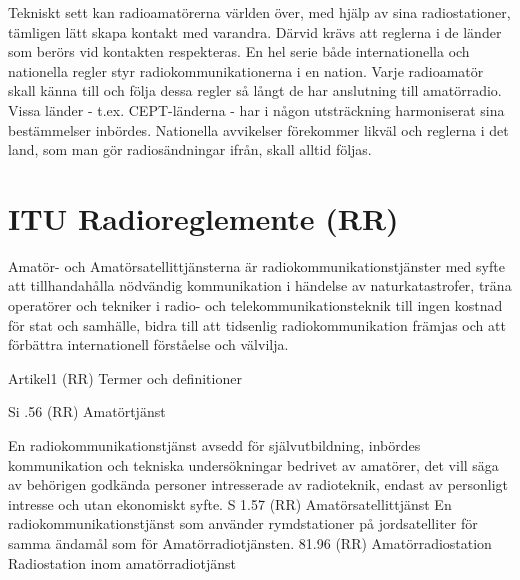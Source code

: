 %
%
%
%
%
%

Tekniskt sett kan radioamatörerna världen
över, med hjälp av sina radiostationer, tämligen lätt skapa kontakt med varandra. Därvid krävs att reglerna i de länder som berörs
vid kontakten respekteras.
En hel serie både internationella och nationella regler styr radiokommunikationerna
i en nation. Varje radioamatör skall känna till
och följa dessa regler så långt de har anslutning till amatörradio. Vissa länder - t.ex.
CEPT-länderna - har i någon utsträckning
harmoniserat sina bestämmelser inbördes.
Nationella avvikelser förekommer likväl och
reglerna i det land, som man gör radiosändningar ifrån, skall alltid följas.

\section{ITU Radioreglemente (RR)}

Amatör- och Amatörsatellittjänsterna är radiokommunikationstjänster med syfte att tillhandahålla nödvändig kommunikation i händelse av naturkatastrofer, träna operatörer
och tekniker i radio- och telekommunikationsteknik till ingen kostnad för stat och
samhälle, bidra till att tidsenlig radiokommunikation främjas och att förbättra internationell förståelse och välvilja.

Artikel1 (RR) Termer och definitioner

Si .56 (RR) Amatörtjänst

En radiokommunikationstjänst avsedd för
självutbildning, inbördes kommunikation och
tekniska undersökningar bedrivet av amatörer, det vill säga av behörigen godkända
personer intresserade av radioteknik, endast av personligt intresse och utan ekonomiskt syfte.
S 1.57 (RR) Amatörsatellittjänst
En radiokommunikationstjänst som använder rymdstationer på jordsatelliter för samma
ändamål som för Amatörradiotjänsten.
81.96 (RR) Amatörradiostation
Radiostation inom amatörradiotjänst

